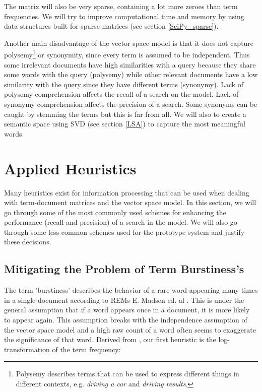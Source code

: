 The matrix will also be very sparse, containing a lot more zeroes than
term frequencies. We will try to improve computational time and memory
by using data structures built for sparse matrices (see section
\ref{SciPy_sparse}). 

Another main disadvantage of the vector space model is that it does
not capture polysemy\footnote{Polysemy describes terms that can be
  used to express different things in different contexts,
  e.g. \textit{driving a car} and \textit{driving results}.} or
synonymity, since every term is assumed to be independent. Thus some
irrelevant documents have high similarities with a query because they
share some words with the query (polysemy) while other relevant
documents have a low similarity with the query since they have
different terms (synonymy).  Lack of polysemy comprehension affects
the recall of a search on the model. Lack of synonymy comprehension
affects the precision of a search. Some synonyms can be caught by
stemming the terms but this is far from all. We will also to create a
semantic space using SVD (see section \ref{LSA}) to capture the most
meaningful words.

\section{Applied Heuristics}

Many heuristics exist for information processing that can be
used when dealing with term-document matrices and the vector space
model. In this section, we will go through some of the most commonly
used schemes for enhancing the performance (recall and precision) of a
search in the model. We will also go through some less common schemes
used for the prototype system and justify these decisions.

\subsection{Mitigating the Problem of Term Burstiness's\label{MitigatingBurstiness}}

The term 'burstiness' describes the behavior of a rare word appearing
many times in a single document according to REMs E. Madsen ed. al
\cite{ModelingWordBurstiness2005}. This is under the general
assumption that if a word appears once in a document, it is more
likely to appear again. This assumption breaks with the independence
assumption of the vector space model and a high raw count of a word
often seems to exaggerate the significance of that word. Derived from
\cite{ModelingWordBurstiness2005}, our first heuristic is the
log-transformation of the term frequency:

